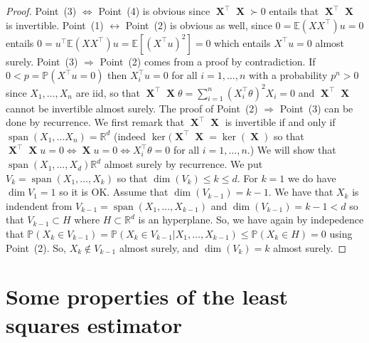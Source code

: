 \documentclass[
	fontsize=11pt, %
	twoside=false, %
	numbers=noenddot, %
]{kaobook}
\DeclareMathOperator{\bX}{\boldsymbol X}
\DeclareMathOperator*{\spa}{span}
\renewcommand{\P}{\mathbb P}
\newcommand{\E}{\mathbb E}
\newcommand{\R}{\mathbb R}
\begin{document}
\begin{proof}
	Point~(3) $\Leftrightarrow$ Point~(4) is obvious since $\bX^\top \bX \succ 0$ entails that $\bX^\top \bX$ is invertible. Point~(1) $\leftrightarrow$ Point~(2) is obvious as well, since $0 = \E(X X^\top) u = 0$ entails $0 = u^\top \E(X X^\top) u = \E[ (X^\top u)^2] = 0$ which entails $X^\top u = 0$ almost surely. Point~(3) $\Rightarrow$ Point~(2) comes from a proof by contradiction. If $0 < p = \P(X^\top u = 0)$ then $X_i^\top u = 0$ for all $i=1, \ldots, n$ with a probability $p^n > 0$ since $X_1, \ldots, X_n$ are iid, so that $\bX^\top \bX \theta = \sum_{i=1}^n (X_i^\top \theta)^2 X_i = 0$ and $\bX^\top \bX$ cannot be invertible almost surely.
	The proof of Point~(2) $\Rightarrow$ Point~(3) can be done by recurrence. We first remark that $\bX^\top \bX$ is invertible if and only if $\spa(X_1, \ldots X_n) = \R^d$ (indeed $\ker(\bX^\top \bX = \ker(\bX)$ so that $\bX^\top \bX u = 0 \Leftrightarrow \bX u = 0 \Leftrightarrow X_i^\top \theta = 0$ for all $i=1, \ldots, n$.) We will show that $\spa(X_1, \ldots, X_d) \R^d$ almost surely by recurrence. We put $V_k = \spa(X_1, \ldots, X_k)$ so that $\dim(V_k) \leq k \leq d$. For $k=1$ we do have $\dim V_1 = 1$ so it is OK. Assume that $\dim(V_{k-1}) = k-1$. We have that $X_k$ is indendent from $V_{k-1} = \spa(X_1, \ldots, X_{k-1})$ and $\dim(V_{k-1}) = k-1 < d$ so that $V_{k-1} \subset H$ where $H \subset \R^d$ is an hyperplane. So, we have again by indepedence that $\P(X_k \in V_{k-1}) = \P(X_k \in V_{k-1} | X_1, \ldots, X_{k-1}) \leq \P(X_k \in H) = 0$ using Point~(2). So, $X_k \notin V_{k-1}$ almost surely, and $\dim(V_k) = k$ almost surely.
\end{proof}

\section{Some properties of the least squares estimator} %
\label{sec:some_properties_of_the_least_squares_estimator}
\end{document}
